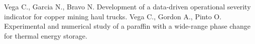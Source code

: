 

\begin{publications}

    \publication
        {Vega C., Garcia N., Bravo N. Development of a data-driven operational severity indicator for copper mining haul trucks.}
        {}
    \publication
        {Vega C., Gordon A., Pinto O. Experimental and numerical study of a paraffin with a wide-range phase change for thermal energy storage.}
        {}
\end{publications}